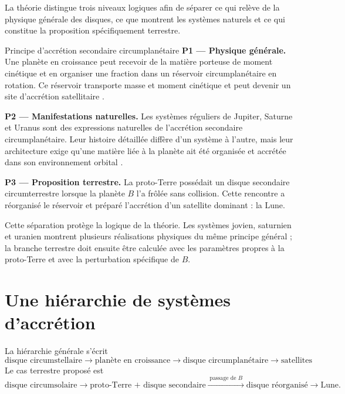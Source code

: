 \documentclass[11pt,a4paper,openany]{report}
\begin{document}
La théorie distingue trois niveaux logiques afin de séparer ce qui relève de la physique générale
des disques, ce que montrent les systèmes naturels et ce qui constitue la proposition
spécifiquement terrestre.

\begin{principe}{Principe d'accrétion secondaire circumplanétaire}
\textbf{P1 --- Physique générale.} Une planète en croissance peut recevoir de la matière porteuse
de moment cinétique et en organiser une fraction dans un réservoir circumplanétaire en rotation.
Ce réservoir transporte masse et moment cinétique et peut devenir un site d'accrétion
satellitaire \cite{Pringle1981,CanupWard2002,CanupWard2006}.

\smallskip
\textbf{P2 --- Manifestations naturelles.} Les systèmes réguliers de Jupiter, Saturne et Uranus
sont des expressions naturelles de l'accrétion secondaire circumplanétaire. Leur histoire
détaillée diffère d'un système à l'autre, mais leur architecture exige qu'une matière liée à la
planète ait été organisée et accrétée dans son environnement orbital
\cite{Nimmo2026,Blanc2025,Helled2020}.

\smallskip
\textbf{P3 --- Proposition terrestre.} La proto-Terre possédait un disque secondaire
circumterrestre lorsque la planète $B$ l'a frôlée sans collision. Cette rencontre a réorganisé le
réservoir et préparé l'accrétion d'un satellite dominant : la Lune.
\end{principe}

Cette séparation protège la logique de la théorie. Les systèmes jovien, saturnien et uranien
montrent plusieurs réalisations physiques du même principe général ; la branche terrestre doit
ensuite être calculée avec les paramètres propres à la proto-Terre et avec la perturbation
spécifique de $B$.

\section{Une hiérarchie de systèmes d'accrétion}

La hiérarchie générale s'écrit
\begin{equation}
\text{disque circumstellaire}\to\text{planète en croissance}\to
\text{disque circumplanétaire}\to\text{satellites}
\label{eq:hierarchie-gen}
\end{equation}
Le cas terrestre proposé est
\begin{equation}
\text{disque circumsolaire}\rightarrow\text{proto-Terre + disque secondaire}
\xrightarrow{\;\text{passage de }B\;}\text{disque réorganisé}\rightarrow\text{Lune}.
\label{eq:hierarchie-terre}
\end{equation}
\end{document}
